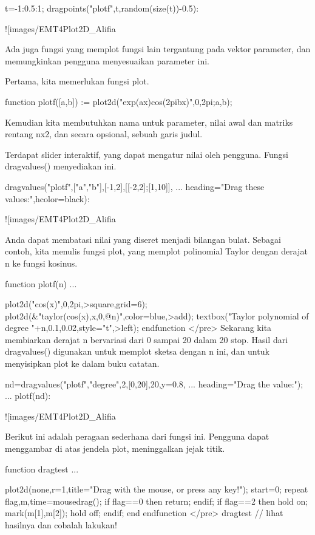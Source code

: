 \documentclass{article}
\begin{document}
\>t=-1:0.5:1; dragpoints("plotf",t,random(size(t))-0.5):


![images/EMT4Plot2D_Alifia%

Ada juga fungsi yang memplot fungsi lain tergantung pada vektor
parameter, dan memungkinkan pengguna menyesuaikan parameter ini.


Pertama, kita memerlukan fungsi plot.


\>function plotf([a,b]) := plot2d("exp(a\*x)\*cos(2pi\*b\*x)",0,2pi;a,b);


Kemudian kita membutuhkan nama untuk parameter, nilai awal dan matriks
rentang nx2, dan secara opsional, sebuah garis judul.


Terdapat slider interaktif, yang dapat mengatur nilai oleh pengguna.
Fungsi dragvalues() menyediakan ini.


\>dragvalues("plotf",["a","b"],[-1,2],[[-2,2];[1,10]], ...  
\>     heading="Drag these values:",hcolor=black):


![images/EMT4Plot2D_Alifia%

Anda dapat membatasi nilai yang diseret menjadi bilangan bulat.
Sebagai contoh, kita menulis fungsi plot, yang memplot polinomial
Taylor dengan derajat n ke fungsi kosinus.


\>function plotf(n) ...


    plot2d("cos(x)",0,2pi,>square,grid=6);
    plot2d(&"taylor(cos(x),x,0,@n)",color=blue,>add);
    textbox("Taylor polynomial of degree "+n,0.1,0.02,style="t",>left);
    endfunction
</pre>
Sekarang kita membiarkan derajat n bervariasi dari 0 sampai 20 dalam
20 stop. Hasil dari dragvalues() digunakan untuk memplot sketsa dengan
n ini, dan untuk menyisipkan plot ke dalam buku catatan.


\>nd=dragvalues("plotf","degree",2,[0,20],20,y=0.8, ...  
\>      heading="Drag the value:"); ...  
\>   plotf(nd):


![images/EMT4Plot2D_Alifia%

Berikut ini adalah peragaan sederhana dari fungsi ini. Pengguna dapat
menggambar di atas jendela plot, meninggalkan jejak titik.


\>function dragtest ...


      plot2d(none,r=1,title="Drag with the mouse, or press any key!");
      start=0;
      repeat
        {flag,m,time}=mousedrag();
        if flag==0 then return; endif;
        if flag==2 then
          hold on; mark(m[1],m[2]); hold off;
        endif;
      end
    endfunction
</pre>
\>dragtest // lihat hasilnya dan cobalah lakukan!
\end{document}
